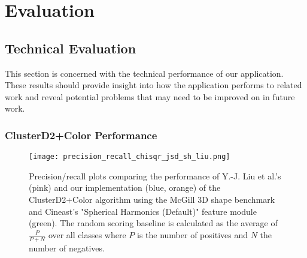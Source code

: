 \chapter{Evaluation}

\section{Technical Evaluation}

This section is concerned with the technical performance of our application. These results should provide insight
into how the application performs to related work and reveal potential problems that may need to be improved on
in future work.

\subsection{ClusterD2+Color Performance}

\begin{figure}
\centering
\captionsetup{width=0.8\textwidth}
\texttt{[image: precision\_recall\_chisqr\_jsd\_sh\_liu.png]}
\caption{Precision/recall plots comparing the performance of Y.-J. Liu et al.'s (pink) and our implementation (blue, orange) of the ClusterD2+Color algorithm using the McGill 3D shape benchmark and Cineast's "Spherical Harmonics (Default)" feature module (green). The random scoring baseline is calculated as the average of $\frac{P}{P+N}$ over all classes where $P$ is the number of positives and $N$ the number of negatives.}
\label{fig:precision_recall}
\end{figure}

